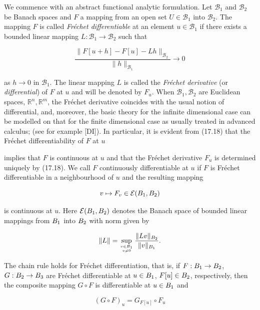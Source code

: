 We commence with an abstract functional analytic formulation. Let $\mathcal{B}_1$ and $\mathcal{B}_2$ be Banach spaces and $F$ a mapping from an open set $U \in \mathcal{B}_1$ into $\mathcal{B}_2$. The mapping $F$ is called \textit{Fr\'echet differentiable} at an element $u \in \mathcal{B}_1$ if there exists a bounded linear mapping $L : \mathcal{B}_1 \to \mathcal{B}_2$ such that

\begin{equation}\tag{17.18}
\frac{\lVert F[u + h] - F[u] - Lh\rVert_{\mathcal{B}_2}}{\lVert h\rVert_{\mathcal{B}_1}} \to 0
\end{equation}

\noindent as $h \to 0$ in $\mathcal{B}_1$. The linear mapping $L$ is called the \textit{Fr\'echet derivative} (or \textit{differential}) of $F$ at $u$ and will be denoted by $F_u$. When $\mathcal{B}_1, \mathcal{B}_2$ are Euclidean spaces, $\mathbb{R}^n, \mathbb{R}^m$, the Fr\'echet derivative coincides with the usual notion of differential, and, moreover, the basic theory for the infinite dimensional case can be modelled on that for the finite dimensional case as usually treated in advanced calculus; (see for example [DI]). In particular, it is evident from (17.18) that the Fr\'echet differentiability of $F$ at $u$


\pagestyle{empty}



implies that $F$ is continuous at $u$ and that the Fr\'echet derivative $F_u$ is determined uniquely by (17.18). We call $F$ continuously differentiable at $u$ if $F$ is Fr\'echet differentiable in a neighbourhood of $u$ and the resulting mapping

\[
v \mapsto F_v \in \mathcal{E}(B_1,B_2)
\]

is continuous at $u$. Here $\mathcal{E}(B_1,B_2)$ denotes the Banach space of bounded linear mappings from $B_1$ into $B_2$ with norm given by

\[
\lVert L\rVert = \sup_{v \in B_1 \atop v \neq 0} \frac{\lVert Lv\rVert_{B_2}}{\lVert v\rVert_{B_1}}.
\]

The chain rule holds for Fr\'echet differentiation, that is, if $F : B_1 \to B_2$, $G : B_2 \to B_3$ are Fr\'echet differentiable at $u \in B_1$, $F[u] \in B_2$, respectively, then the composite mapping $G \circ F$ is differentiable at $u \in B_1$ and

\begin{equation}
(G \circ F)_u = G_{F[u]} \circ F_u
\tag{17.19}
\end{equation}

